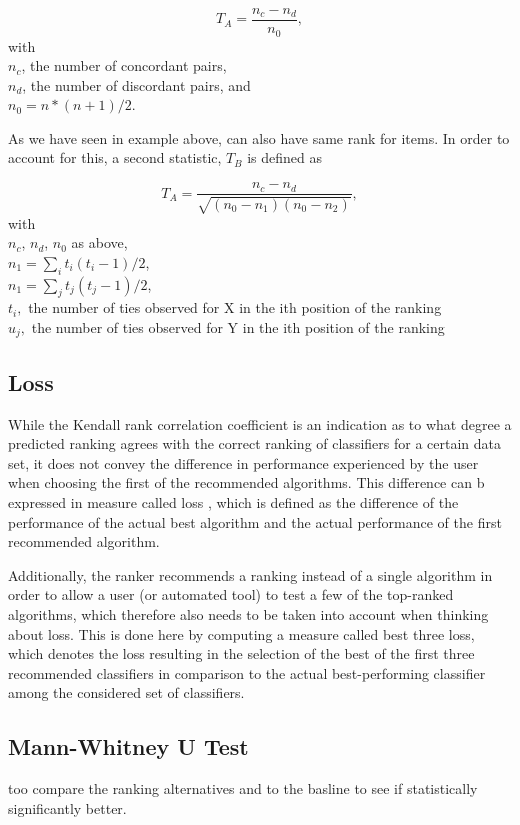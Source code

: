 $$T_A = \frac{n_c - n_d}{n_0},$$
with \\
$n_c$, the number of concordant pairs, \\
$n_d$, the number of discordant pairs, and \\
$n_0 = n * (n + 1) / 2$.

As we have seen in example above, can also have same rank for items. In order to account for this, a second statistic, $T_B$ is defined as

$$T_A = \frac{n_c - n_d}{\sqrt{(n_0 - n_1 )(n_0 - n_2 )}},$$
with \\
$n_c$, $n_d$, $n_0$ as above, \\
$n_1=\sum_i{t_i(t_i-1)/2}$, \\
$n_1=\sum_j{t_j(t_j-1)/2}$, \\
$t_i,$ the number of ties observed for X in the ith position of the ranking \\
$u_j,$ the number of ties observed for Y in the ith position of the ranking 


\subsection{Loss}
While the Kendall rank correlation coefficient is an indication as to what degree a predicted ranking agrees with the correct ranking of classifiers for a certain data set, it does not convey the difference in performance experienced by the user when choosing the first of the recommended algorithms. This difference can b expressed in measure called loss \cite{DBLP:conf/mldm/LeiteBV12}, which is defined as the difference of the performance of the actual best algorithm and the actual performance of the first recommended algorithm. 

Additionally, the ranker recommends a ranking instead of a single algorithm in order to allow a user (or automated tool) to test a few of the top-ranked algorithms, which therefore also needs to be taken into account when thinking about loss. This is done here by computing a measure called best three loss, which denotes the loss resulting in the selection of the best of the first three recommended classifiers in comparison to the actual best-performing classifier among the considered set of classifiers. 

\subsection{Mann-Whitney U Test}
too compare the ranking alternatives and to the basline to see if statistically significantly better.
